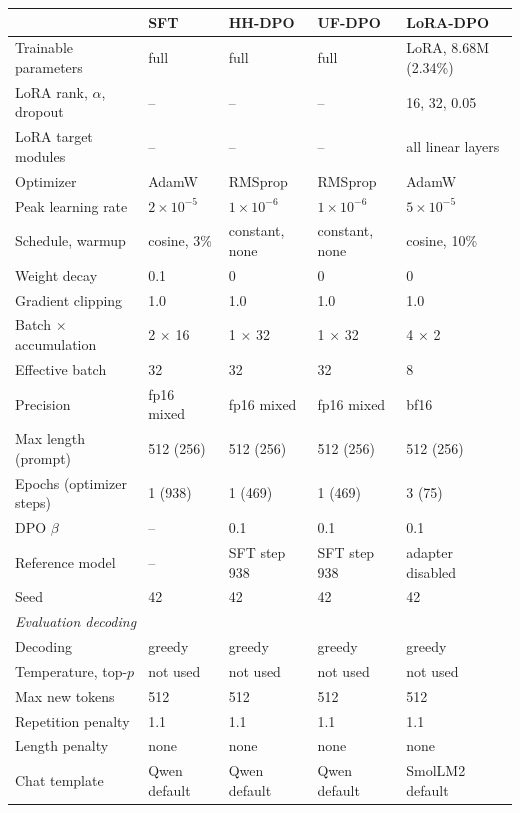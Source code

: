 \begin{tabular}{l l l l l}
\toprule
 & SFT & HH-DPO & UF-DPO & LoRA-DPO \\
\midrule
Trainable parameters & full & full & full & LoRA, 8.68M (2.34\%) \\
LoRA rank, $\alpha$, dropout & -- & -- & -- & 16, 32, 0.05 \\
LoRA target modules & -- & -- & -- & all linear layers \\
Optimizer & AdamW & RMSprop & RMSprop & AdamW \\
Peak learning rate & $2\times10^{-5}$ & $1\times10^{-6}$ & $1\times10^{-6}$ & $5\times10^{-5}$ \\
Schedule, warmup & cosine, 3\% & constant, none & constant, none & cosine, 10\% \\
Weight decay & 0.1 & 0 & 0 & 0 \\
Gradient clipping & 1.0 & 1.0 & 1.0 & 1.0 \\
Batch $\times$ accumulation & 2 $\times$ 16 & 1 $\times$ 32 & 1 $\times$ 32 & 4 $\times$ 2 \\
Effective batch & 32 & 32 & 32 & 8 \\
Precision & fp16 mixed & fp16 mixed & fp16 mixed & bf16 \\
Max length (prompt) & 512 (256) & 512 (256) & 512 (256) & 512 (256) \\
Epochs (optimizer steps) & 1 (938) & 1 (469) & 1 (469) & 3 (75) \\
DPO $\beta$ & -- & 0.1 & 0.1 & 0.1 \\
Reference model & -- & SFT step 938 & SFT step 938 & adapter disabled \\
Seed & 42 & 42 & 42 & 42 \\
\midrule
\multicolumn{5}{l}{\textit{Evaluation decoding}} \\
Decoding & greedy & greedy & greedy & greedy \\
Temperature, top-$p$ & not used & not used & not used & not used \\
Max new tokens & 512 & 512 & 512 & 512 \\
Repetition penalty & 1.1 & 1.1 & 1.1 & 1.1 \\
Length penalty & none & none & none & none \\
Chat template & Qwen default & Qwen default & Qwen default & SmolLM2 default \\
\bottomrule
\end{tabular}
